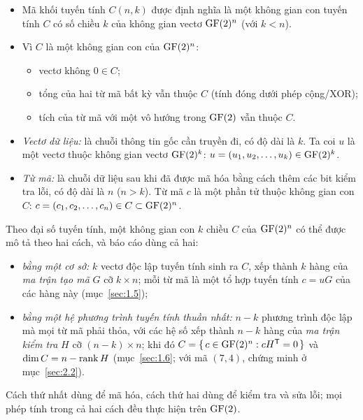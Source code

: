 \begin{itemize}
  \item Mã khối tuyến tính $C(n,k)$ được định nghĩa là một không gian con
        tuyến tính $C$ có số chiều $k$ của không gian vectơ $\mathrm{GF}(2)^{n}$ (với
        $k < n$).
  \item Vì $C$ là một không gian con của $\mathrm{GF}(2)^{n}$:
        \begin{itemize}
          \item vectơ không $0 \in C$;
          \item tổng của hai từ mã bất kỳ vẫn thuộc $C$ (tính đóng dưới phép
                cộng/XOR);
          \item tích của từ mã với một vô hướng trong $\mathrm{GF}(2)$ vẫn thuộc $C$.
        \end{itemize}
\end{itemize}

\begin{itemize}
  \item \emph{Vectơ dữ liệu:} là chuỗi thông tin gốc cần truyền đi, có độ dài
        là $k$. Ta coi $u$ là một vectơ thuộc không gian vectơ $\mathrm{GF}(2)^{k}$:
        $u = (u_1, u_2, \dots, u_k) \in \mathrm{GF}(2)^{k}$.
  \item \emph{Từ mã:} là chuỗi dữ liệu sau khi đã được mã hóa bằng cách thêm
        các bit kiểm tra lỗi, có độ dài là $n$ ($n > k$). Từ mã $c$ là một
        phần tử thuộc không gian con $C$:
        $c = (c_1, c_2, \dots, c_n) \in C \subset \mathrm{GF}(2)^{n}$.
\end{itemize}

Theo đại số tuyến tính, một không gian con $k$ chiều $C$ của $\mathrm{GF}(2)^{n}$ có thể
được mô tả theo hai cách, và báo cáo dùng cả hai:
\begin{itemize}
  \item \emph{bằng một cơ sở:} $k$ vectơ độc lập tuyến tính sinh ra $C$, xếp
        thành $k$ hàng của \emph{ma trận tạo mã} $G$ cỡ $k \times n$; mỗi từ
        mã là một tổ hợp tuyến tính $c = uG$ của các hàng này
        (mục~\ref{sec:1.5});
  \item \emph{bằng một hệ phương trình tuyến tính thuần nhất:} $n - k$ phương
        trình độc lập mà mọi từ mã phải thỏa, với các hệ số xếp thành $n - k$
        hàng của \emph{ma trận kiểm tra} $H$ cỡ $(n-k) \times n$; khi đó
        $C = \{\, c \in \mathrm{GF}(2)^{n} : cH^{\mathsf{T}} = 0 \,\}$ và $\dim C = n - \operatorname{rank} H$
        (mục~\ref{sec:1.6}; với mã $(7,4)$, chứng minh ở mục~\ref{sec:2.2}).
\end{itemize}
Cách thứ nhất dùng để mã hóa, cách thứ hai dùng để kiểm tra và sửa lỗi; mọi
phép tính trong cả hai cách đều thực hiện trên $\mathrm{GF}(2)$.

